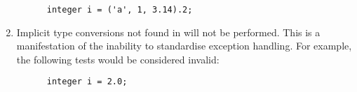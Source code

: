 \documentclass[../gazprea.tex]{subfiles}
\begin{document}
\begin{enumerate}
\begin{lstlisting}
      integer i = ('a', 1, 3.14).2;
    \end{lstlisting}
  \item
    Implicit type conversions not found in  will not be performed. This
    is a manifestation of the inability to standardise exception handling. For example, the
    following tests would be considered invalid:
    \begin{lstlisting}
      integer i = 2.0;
    \end{lstlisting}
\end{enumerate}
\end{document}

